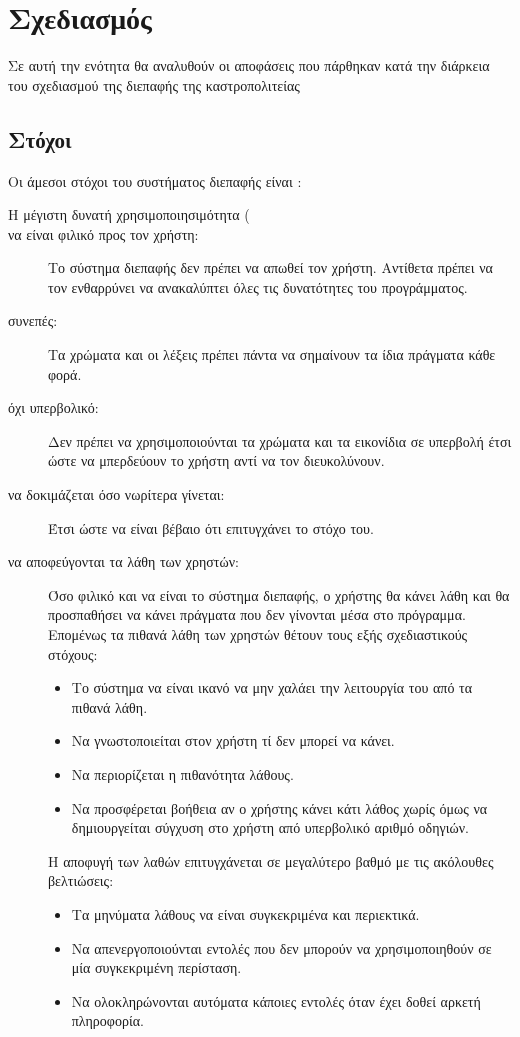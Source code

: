 \documentclass{assignment}
\begin{document}

\section{Σχεδιασμός}

Σε αυτή την ενότητα θα αναλυθούν οι αποφάσεις που πάρθηκαν κατά την διάρκεια του σχεδιασμού της διεπαφής της καστροπολιτείας

\subsection{Στόχοι}
Οι άμεσοι στόχοι του συστήματος διεπαφής είναι \cite{class_notes}:
\begin{description}
\item [Η μέγιστη δυνατή χρησιμοποιησιμότητα (]
\item [να είναι φιλικό προς τον χρήστη:] Το σύστημα διεπαφής δεν πρέπει να απωθεί τον χρήστη. Αντίθετα πρέπει να τον ενθαρρύνει να ανακαλύπτει όλες τις δυνατότητες του προγράμματος.
\item [συνεπές:] Τα χρώματα και οι λέξεις πρέπει πάντα να σημαίνουν τα ίδια πράγματα κάθε φορά.
\item [όχι υπερβολικό:] Δεν πρέπει να χρησιμοποιούνται τα χρώματα και τα εικονίδια σε υπερβολή έτσι ώστε να μπερδεύουν το χρήστη αντί να τον διευκολύνουν.
\item [να δοκιμάζεται όσο νωρίτερα γίνεται:] Έτσι ώστε να είναι βέβαιο ότι επιτυγχάνει το στόχο του.
\item [να αποφεύγονται τα λάθη των χρηστών:] Όσο φιλικό και να είναι το σύστημα διεπαφής, ο χρήστης θα κάνει λάθη και θα προσπαθήσει να κάνει πράγματα που δεν γίνονται μέσα στο πρόγραμμα. Επομένως τα πιθανά λάθη των χρηστών θέτουν τους εξής σχεδιαστικούς στόχους:
  \begin{itemize}
  \item Το σύστημα να είναι ικανό να μην χαλάει την λειτουργία του από τα πιθανά λάθη.
  \item Να γνωστοποιείται στον χρήστη τί δεν μπορεί να κάνει.
  \item Να περιορίζεται η πιθανότητα λάθους.
  \item Να προσφέρεται βοήθεια αν ο χρήστης κάνει κάτι λάθος χωρίς όμως να δημιουργείται σύγχυση στο χρήστη από υπερβολικό αριθμό οδηγιών. 
  \end{itemize} 
Η αποφυγή των λαθών επιτυγχάνεται σε μεγαλύτερο βαθμό με τις ακόλουθες βελτιώσεις:
  \begin{itemize}
  \item Τα μηνύματα λάθους να είναι συγκεκριμένα και περιεκτικά.
  \item Να απενεργοποιούνται εντολές που δεν μπορούν να χρησιμοποιηθούν σε μία συγκεκριμένη περίσταση.
  \item Να ολοκληρώνονται αυτόματα κάποιες εντολές όταν έχει δοθεί αρκετή πληροφορία.
  \end{itemize}
\end{description}
\end{document}
